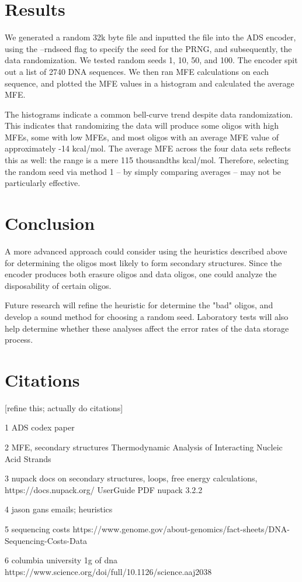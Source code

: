 \documentclass{article}
\begin{document}
\section{Results}
We generated a random 32k byte file and inputted the file into the ADS encoder, using the --rndseed flag to specify the seed for the PRNG, and subsequently, the data randomization. We tested random seeds 1, 10, 50, and 100. The encoder spit out a list of 2740 DNA sequences. We then ran MFE calculations on each sequence, and plotted the MFE values in a histogram and calculated the average MFE.



The histograms indicate a common bell-curve trend despite data randomization. This indicates that randomizing the data will produce some oligos with high MFEs, some with low MFEs, and most oligos with an average MFE value of approximately -14 kcal/mol. The average MFE across the four data sets reflects this as well: the range is a mere 115 thousandths kcal/mol. Therefore, selecting the random seed via method 1 -- by simply comparing averages -- may not be particularly effective.


\section{Conclusion}
A more advanced approach could consider using the heuristics described above for determining the oligos most likely to form secondary structures. Since the encoder produces both erasure oligos and data oligos, one could analyze the disposability of certain oligos. 

Future research will refine the heuristic for determine the "bad" oligos, and develop a sound method for choosing a random seed. Laboratory tests will also help determine whether these analyses affect the error rates of the data storage process.

\section{Citations}
[refine this; actually do citations]

1 ADS codex paper 


2 MFE, secondary structures
Thermodynamic Analysis of
Interacting Nucleic Acid Strands 

3 nupack docs on secondary structures, loops, free energy calculations,
https://docs.nupack.org/ 
UserGuide PDF nupack 3.2.2

4 jason gans emails; heuristics

5 sequencing costs 
https://www.genome.gov/about-genomics/fact-sheets/DNA-Sequencing-Costs-Data

6 columbia university 1g of dna 
https://www.science.org/doi/full/10.1126/science.aaj2038
\end{document}
